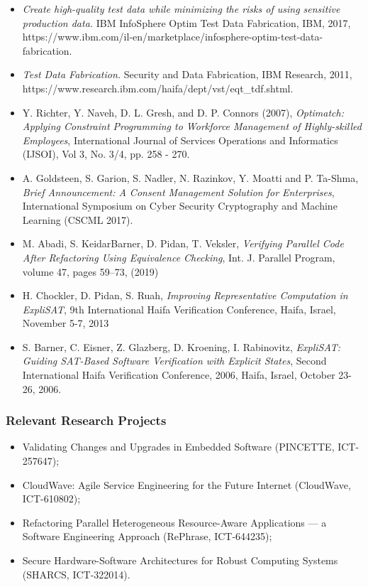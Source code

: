 \documentclass[a4paper,11pt]{article}
\begin{document}
\begin{itemize}

\item
\emph{Create high-quality test data while minimizing the risks of using sensitive production data.} IBM InfoSphere Optim Test Data Fabrication, IBM, 2017, https://www.ibm.com/il-en/marketplace/infosphere-optim-test-data-fabrication.
\item
\emph{Test Data Fabrication.} Security and Data Fabrication, IBM Research, 2011, https://www.research.ibm.com/haifa/dept/vst/eqt\_tdf.shtml.
\item
Y. Richter, Y. Naveh, D. L. Gresh, and D. P. Connors (2007), \emph{Optimatch: Applying Constraint Programming to Workforce Management of Highly-skilled Employees}, International Journal of Services Operations and Informatics (IJSOI), Vol 3, No. 3/4, pp. 258 - 270.
\item
A. Goldsteen, S. Garion, S. Nadler, N. Razinkov, Y. Moatti and P. Ta-Shma, \emph{Brief Announcement: A Consent Management Solution for Enterprises}, International Symposium on Cyber Security Cryptography and Machine Learning (CSCML 2017).
\item
M. Abadi, S. Keidar\-Barner, D. Pidan, T. Veksler, \emph{Verifying Parallel Code After Refactoring Using Equivalence Checking}, Int. J. Parallel Program, volume 47, pages 59--73, (2019)
\item
H. Chockler, D. Pidan, S. Ruah, \emph{Improving Representative Computation in ExpliSAT}, 9th International Haifa Verification Conference, Haifa, Israel, November 5-7, 2013
\item
S. Barner, C. Eisner, Z. Glazberg, D. Kroening, I. Rabinovitz, \emph{ExpliSAT: Guiding SAT-Based Software Verification with Explicit States}, Second International Haifa Verification Conference, 2006, Haifa, Israel, October 23-26, 2006.
\end{itemize}

\subsubsection*{Relevant Research Projects}
\begin{itemize}
\item
Validating Changes and Upgrades in Embedded Software (PINCETTE, ICT-257647);
\item
CloudWave: Agile Service Engineering for the Future Internet (CloudWave, ICT-610802);
\item
Refactoring Parallel Heterogeneous Resource-Aware Applications --- a Software Engineering Approach (RePhrase, ICT-644235);
\item
Secure Hardware-Software Architectures for Robust Computing Systems (SHARCS, ICT-322014).

\end{itemize}
\end{document}
